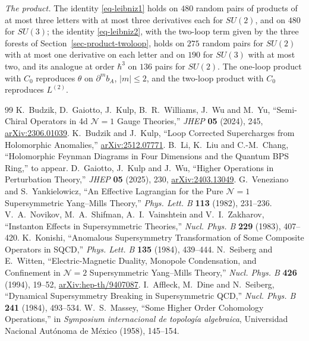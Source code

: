\documentclass[11pt]{article}
\numberwithin{equation}{section}
\numberwithin{figure}{section}
\numberwithin{table}{section}
\theoremstyle{definition}
\begin{document}
\emph{The product.} The identity \eqref{eq-leibniz1} holds on $480$ random pairs of products of at most three letters with at most three derivatives each for $SU(2)$, and on $480$ for $SU(3)$; the identity \eqref{eq-leibniz2}, with the two-loop term given by the three forests of Section~\ref{sec-product-twoloop}, holds on $275$ random pairs for $SU(2)$ with at most one derivative on each letter and on $190$ for $SU(3)$ with at most two, and its analogue at order $\hbar^3$ on $136$ pairs for $SU(2)$. The one-loop product with $C_0$ reproduces $\theta$ on $\partial^mb_A$, $|m|\le2$, and the two-loop product with $C_0$ reproduces $L^{(2)}$.

\begin{thebibliography}{99}
K.~Budzik, D.~Gaiotto, J.~Kulp, B.~R.~Williams, J.~Wu and M.~Yu, ``Semi-Chiral Operators in 4d $\mathcal N=1$ Gauge Theories,'' \emph{JHEP} \textbf{05} (2024), 245, \href{https://arxiv.org/abs/2306.01039}{arXiv:2306.01039}.
K.~Budzik and J.~Kulp, ``Loop Corrected Supercharges from Holomorphic Anomalies,'' \href{https://arxiv.org/abs/2512.07771}{arXiv:2512.07771}.
B.~Li, K.~Liu and C.-M.~Chang, ``Holomorphic Feynman Diagrams in Four Dimensions and the Quantum BPS Ring,'' to appear.
D.~Gaiotto, J.~Kulp and J.~Wu, ``Higher Operations in Perturbation Theory,'' \emph{JHEP} \textbf{05} (2025), 230, \href{https://arxiv.org/abs/2403.13049}{arXiv:2403.13049}.
G.~Veneziano and S.~Yankielowicz, ``An Effective Lagrangian for the Pure $\mathcal N=1$ Supersymmetric Yang--Mills Theory,'' \emph{Phys. Lett. B} \textbf{113} (1982), 231--236.
V.~A.~Novikov, M.~A.~Shifman, A.~I.~Vainshtein and V.~I.~Zakharov, ``Instanton Effects in Supersymmetric Theories,'' \emph{Nucl. Phys. B} \textbf{229} (1983), 407--420.
K.~Konishi, ``Anomalous Supersymmetry Transformation of Some Composite Operators in SQCD,'' \emph{Phys. Lett. B} \textbf{135} (1984), 439--444.
N.~Seiberg and E.~Witten, ``Electric-Magnetic Duality, Monopole Condensation, and Confinement in $\mathcal N=2$ Supersymmetric Yang--Mills Theory,'' \emph{Nucl. Phys. B} \textbf{426} (1994), 19--52, \href{https://arxiv.org/abs/hep-th/9407087}{arXiv:hep-th/9407087}.
I.~Affleck, M.~Dine and N.~Seiberg, ``Dynamical Supersymmetry Breaking in Supersymmetric QCD,'' \emph{Nucl. Phys. B} \textbf{241} (1984), 493--534.
W.~S.~Massey, ``Some Higher Order Cohomology Operations,'' in \emph{Symposium internacional de topolog\'ia algebraica}, Universidad Nacional Aut\'onoma de M\'exico (1958), 145--154.

\end{thebibliography}
\end{document}
